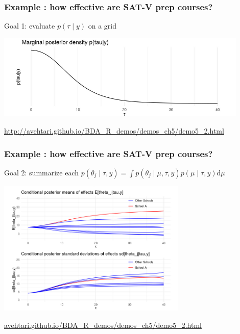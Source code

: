 \documentclass{beamer}
\begin{document}
\begin{frame}
\frametitle{Example : how effective are SAT-V prep courses? }

Goal 1: evaluate $p(\tau \mid y)$ on a grid

\begin{center}
\includegraphics[width=120mm]{marg_post.png}
\end{center}

\url{http://avehtari.github.io/BDA_R_demos/demos_ch5/demo5_2.html}
\end{frame}

\begin{frame}
\frametitle{Example : how effective are SAT-V prep courses? }

Goal 2: summarize each $p(\theta_j \mid \tau, y) = \int p(\theta_j \mid \mu, \tau, y) p(\mu \mid \tau, y)\text{d}\mu$ 

\begin{center}
\includegraphics[width=90mm]{cond_post.png}
\end{center}

\url{avehtari.github.io/BDA_R_demos/demos_ch5/demo5_2.html}
\end{frame}
\end{document}
